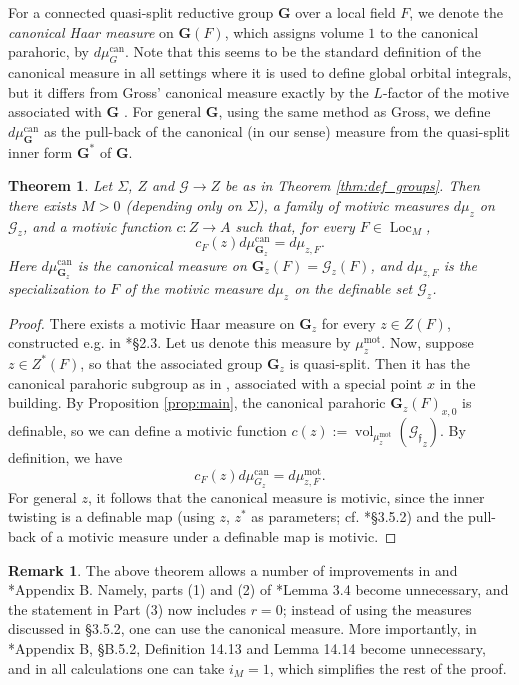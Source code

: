\documentclass{amsart}
\newcommand{\vol}{\operatorname{vol}}
\newcommand{\loc}{\operatorname{Loc}}
\newcommand{\bG}{\mathbf{G}}
\newcommand{\can}{\mathrm{can}}
\newcommand{\cG}{\mathcal{G}}
\newcommand{\ff}{{\mathfrak f}}
\newcommand\mot{\mathrm{mot}}
\theoremstyle{plain}
\newtheorem{theorem}[thm]{Theorem}
\theoremstyle{definition}
\newtheorem{rem}[thm]{Remark}
\begin{document}
For a connected quasi-split reductive group $\bG$ over a local field $F$, we denote the \emph{canonical Haar measure} on $\bG(F)$, which assigns volume $1$ to the canonical parahoric, by $d\mu_G^\can$. 
Note that this seems to be the standard definition of the canonical measure in all settings where it is used to define global orbital integrals, but it differs from Gross' canonical measure exactly by the $L$-factor of the motive associated with $\bG$ \cite{gross:motive}.  For general $\bG$, using the same method as Gross, 
we define $d\mu_{\bG}^\can$ as the pull-back of the canonical (in our sense) measure from the quasi-split inner form $\bG^\ast$ of $\bG$.  

\begin{theorem}\label{thm:mot_meas}
 Let $\Sigma$, $Z$  and $\cG \to Z$ be as in Theorem \ref{thm:def_groups}. 
Then there exists $M>0$ (depending only on $\Sigma$), a family of  motivic measures $d\mu_z$ on $\cG_z$, and a motivic function $c:Z\to A$ such that, for every $F\in \loc_M$,
$$c_F(z) d\mu_{\bG_z}^\can = d\mu_{z, F}.$$ 
Here $d\mu_{\bG_z}^\can$ is the canonical measure on $\bG_z(F)=\cG_z(F)$,
and $d\mu_{z, F}$ is the specialization to $F$ of the motivic measure $d\mu_z$ on the definable set $\cG_z$. 
\end{theorem} 

\begin{proof} There exists a motivic Haar measure on $\bG_z$ for every $z\in Z(F)$, constructed e.g. in \cite{hales:transfert}*{\S 2.3}. Let us denote this measure by $\mu_z^\mot$. Now, suppose 
$z\in Z^\ast(F)$, so that the associated group $\bG_z$ is quasi-split.  
Then it has the canonical parahoric subgroup as in \cite{gross:motive}, associated with a special point $x$ in the building. 
By Proposition \ref{prop:main}, the canonical parahoric $\bG_z(F)_{x, 0}$ is definable, so we can define  a motivic function $c(z):=\vol_{\mu_z^\mot}({\cG_{\ff}}_z)$. 
By definition, we have 
\[
c_F(z) d\mu_{G_z}^\can = d\mu_{z, F}^\mot.
\]
For general $z$, it follows that the canonical measure is motivic, since the inner twisting is a definable map
(using $z$, $z^\ast$ as parameters; cf. \cite{CGH-2}*{\S 3.5.2}) and the pull-back of a motivic measure under a definable map is motivic.
\end{proof}

\begin{rem} The above theorem allows a number of improvements in \cite{CGH-2} and 
\cite{S-T}*{Appendix B}. 
Namely,  parts (1) and (2) of \cite{CGH-2}*{Lemma 3.4} become unnecessary, and the statement in Part (3) now includes $r=0$; instead of using the measures discussed in \S 3.5.2, one can use the canonical measure. 
More importantly, in \cite{S-T}*{Appendix B, \S B.5.2}, Definition 14.13 and Lemma 14.14 become unnecessary, and in all calculations one can take $i_M=1$, which simplifies the rest of the proof.
\end{rem}
\end{document}
